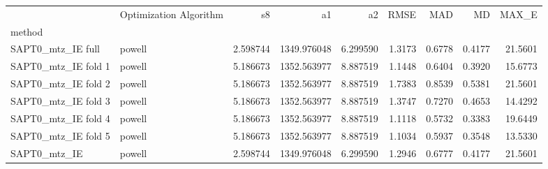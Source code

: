 \begin{tabular}{llrrrrrrr}
 & Optimization Algorithm & s8 & a1 & a2 & RMSE & MAD & MD & MAX_E \\
method &  &  &  &  &  &  &  &  \\
SAPT0_mtz_IE full & powell & 2.598744 & 1349.976048 & 6.299590 & 1.3173 & 0.6778 & 0.4177 & 21.5601 \\
SAPT0_mtz_IE fold 1 & powell & 5.186673 & 1352.563977 & 8.887519 & 1.1448 & 0.6404 & 0.3920 & 15.6773 \\
SAPT0_mtz_IE fold 2 & powell & 5.186673 & 1352.563977 & 8.887519 & 1.7383 & 0.8539 & 0.5381 & 21.5601 \\
SAPT0_mtz_IE fold 3 & powell & 5.186673 & 1352.563977 & 8.887519 & 1.3747 & 0.7270 & 0.4653 & 14.4292 \\
SAPT0_mtz_IE fold 4 & powell & 5.186673 & 1352.563977 & 8.887519 & 1.1118 & 0.5732 & 0.3383 & 19.6449 \\
SAPT0_mtz_IE fold 5 & powell & 5.186673 & 1352.563977 & 8.887519 & 1.1034 & 0.5937 & 0.3548 & 13.5330 \\
SAPT0_mtz_IE & powell & 2.598744 & 1349.976048 & 6.299590 & 1.2946 & 0.6777 & 0.4177 & 21.5601 \\
\end{tabular}
